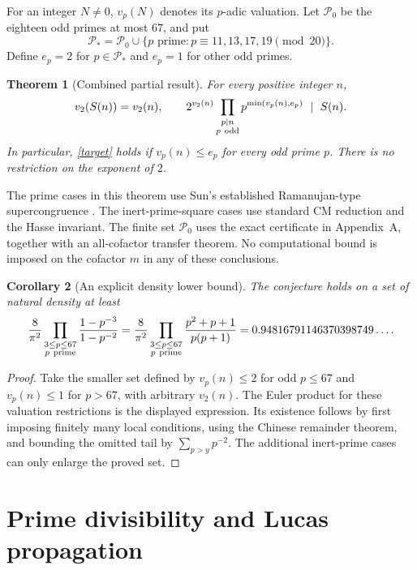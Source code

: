 \documentclass[11pt,a4paper]{article}
\newtheorem{theorem}{Theorem}[section]
\newtheorem{corollary}[theorem]{Corollary}
\theoremstyle{remark}\newtheorem{remark}[theorem]{Remark}
\begin{document}
For an integer \(N\ne0\), \(v_p(N)\) denotes its \(p\)-adic valuation.
Let \(\mathcal P_0\) be the eighteen odd primes at most \(67\), and put
\[
 \mathcal P_*=\mathcal P_0\cup
 \{p\text{ prime}:p\equiv11,13,17,19\pmod {20}\}.
\]
Define \(e_p=2\) for \(p\in\mathcal P_*\) and \(e_p=1\) for other odd primes.

\begin{theorem}[Combined partial result]\label{main}
For every positive integer \(n\),
\begin{equation}\label{divisor}
 v_2(S(n))=v_2(n),\qquad
 2^{v_2(n)}\prod_{\substack{p\mid n\\p\ {\rm odd}}}
 p^{\min(v_p(n),e_p)}\ \mid\ S(n).
\end{equation}
In particular, \eqref{target} holds if \(v_p(n)\le e_p\) for every odd
prime \(p\). There is no restriction on the exponent of \(2\).
\end{theorem}

The prime cases in this theorem use Sun's established Ramanujan-type
supercongruence \cite{SunRefinement}. The inert-prime-square cases use
standard CM reduction and the Hasse invariant. The finite set
\(\mathcal P_0\) uses the exact certificate in Appendix~A, together with
an all-cofactor transfer theorem. No computational bound is imposed on
the cofactor \(m\) in any of these conclusions.

\begin{corollary}[An explicit density lower bound]\label{density}
The conjecture holds on a set of natural density at least
\[
 \frac8{\pi^2}\prod_{\substack{3\le p\le67\\p\ {\rm prime}}}
 \frac{1-p^{-3}}{1-p^{-2}}
 =
 \frac8{\pi^2}\prod_{\substack{3\le p\le67\\p\ {\rm prime}}}
 \frac{p^2+p+1}{p(p+1)}
 =0.94816791146370398749\ldots .
\]
\end{corollary}
\begin{proof}
Take the smaller set defined by \(v_p(n)\le2\) for odd \(p\le67\)
and \(v_p(n)\le1\) for \(p>67\), with arbitrary \(v_2(n)\).
The Euler product for these valuation restrictions is the displayed
expression. Its existence follows by first imposing finitely many local
conditions, using the Chinese remainder theorem, and bounding the omitted
tail by \(\sum_{p>y}p^{-2}\). The additional inert-prime cases can only
enlarge the proved set.
\end{proof}

\section{Prime divisibility and Lucas propagation}
\end{document}
